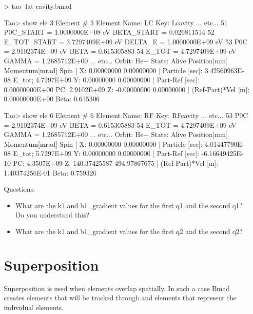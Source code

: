 \documentclass{hitec}
\newcommand{\Section}[1]{\section{#1}\vspace*{-1ex}}
\begin{document}
{\small
\begin{code}
> tao -lat cavity.bmad

Tao> show ele 3
Element #                3
Element Name: LC
Key: Lcavity
... etc...
   51   P0C_START                    =  1.0000000E+08 eV            BETA_START      =  0.026811514
   52   E_TOT_START                  =  3.7297409E+09 eV            DELTA_E         =  1.0000000E+09 eV
   53   P0C                          =  2.9102374E+09 eV            BETA            =  0.615305883
   54   E_TOT                        =  4.7297409E+09 eV            GAMMA           =  1.2685712E+00
... etc...    
Orbit:  He+   State: Alive
         Position[mm] Momentum[mrad]        Spin   |
  X:       0.00000000     0.00000000               | Particle [sec]:      3.42560963E-08  E_tot;  4.7297E+09
  Y:       0.00000000     0.00000000               | Part-Ref [sec]:      0.00000000E+00  PC:     2.9102E+09
  Z:      -0.00000000     0.00000000               | (Ref-Part)*Vel [m]:  0.00000000E+00  Beta:    0.615306

Tao> show ele 6
Element #                6
Element Name: RF
Key: RFcavity
... etc...
   53   P0C                          =  2.9102374E+09 eV            BETA            =  0.615305883
   54   E_TOT                        =  4.7297409E+09 eV            GAMMA           =  1.2685712E+00
... etc...
 Orbit:  He+   State: Alive
         Position[mm] Momentum[mrad]        Spin   |
  X:       0.00000000     0.00000000               | Particle [sec]:      4.01447790E-08  E_tot;  5.7297E+09
  Y:       0.00000000     0.00000000               | Part-Ref [sec]:     -6.16649425E-10  PC:     4.3507E+09
  Z:     140.37425587   494.97867675               | (Ref-Part)*Vel [m]:  1.40374256E-01  Beta:    0.759326
\end{code}}

Questions:
\begin{itemize}
\item What are the k1 and b1_gradient values for the first q1 and the second q1? Do you understand this?
\item What are the k1 and b1_gradient values for the first q2 and the second q2?
\end{itemize}

\Section{Superposition}

Superposition is used when elements overlap spatially. In such a case Bmad creates  elements that will be tracked through
and  elements that represent the individual elements.
\end{document}
